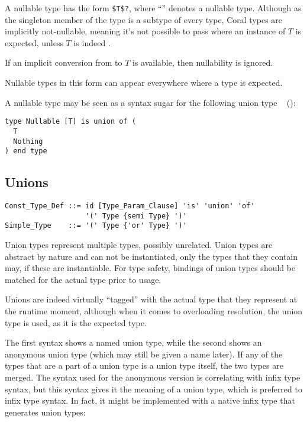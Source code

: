 A nullable type has the form \lstinline!$T$?!, where ``'' denotes a nullable type. Although  as the singleton member of the  type is a subtype of every type, Coral types are implicitly not-nullable, meaning it's not possible to pass  where an instance of $T$ is expected, unless $T$ is indeed . 

If an implicit conversion from  to $T$ is available, then nullability is ignored. 

Nullable types in this form can appear everywhere where a type is expected. 

A nullable type may be seen as a syntax sugar for the following union type ~ ():
\begin{lstlisting}
type Nullable [T] is union of (
  T
  Nothing
) end type
\end{lstlisting}






\subsection{Unions}
\label{sec:unions}

\syntax\begin{lstlisting}
Const_Type_Def ::= id [Type_Param_Clause] 'is' 'union' 'of'
                   '(' Type {semi Type} ')'
Simple_Type    ::= '(' Type {'or' Type} ')'
\end{lstlisting}

Union types represent multiple types, possibly unrelated. Union types are abstract by nature and can not be instantiated, only the types that they contain may, if these are instantiable. For type safety, bindings of union types should be matched for the actual type prior to usage. 

Unions are indeed virtually ``tagged'' with the actual type that they represent at the runtime moment, although when it comes to overloading resolution, the union type is used, as it is the expected type. 

The first syntax shows a named union type, while the second shows an anonymous union type (which may still be given a name later). If any of the types that are a part of a union type is a union type itself, the two types are merged. The syntax used for the anonymous version is correlating with infix type syntax, but this syntax gives it the meaning of a union type, which is preferred to infix type syntax. In fact, it might be implemented with a native infix type that generates union types:

